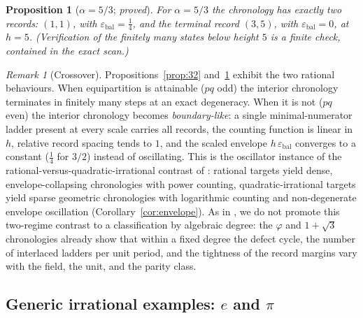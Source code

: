 \documentclass[11pt]{article}
\newtheorem{proposition}[theorem]{Proposition}
\theoremstyle{definition}
\theoremstyle{remark}
\newtheorem{remark}[theorem]{Remark}
\newcommand{\eb}{\varepsilon_{\mathrm{bal}}}
\begin{document}
\begin{proposition}[$\alpha=5/3$; \emph{proved}]\label{prop:53}
For $\alpha=5/3$ the chronology has exactly two records: $(1,1)$, with $\eb=\tfrac14$, and the terminal record $(3,5)$, with $\eb=0$, at $h=5$. (Verification of the finitely many states below height $5$ is a finite check, contained in the exact scan.)
\end{proposition}

\begin{remark}[Crossover]\label{rem:crossover}
Propositions~\ref{prop:32} and~\ref{prop:53} exhibit the two rational behaviours. When equipartition is attainable ($pq$ odd) the interior chronology terminates in finitely many steps at an exact degeneracy. When it is not ($pq$ even) the interior chronology becomes \emph{boundary-like}: a single minimal-numerator ladder present at every scale carries all records, the counting function is linear in $h$, relative record spacing tends to $1$, and the scaled envelope $h\,\eb$ converges to a constant ($\tfrac14$ for $3/2$) instead of oscillating. This is the oscillator instance of the rational-versus-quadratic-irrational contrast of \cite{quartercircle}: rational targets yield dense, envelope-collapsing chronologies with power counting, quadratic-irrational targets yield sparse geometric chronologies with logarithmic counting and non-degenerate envelope oscillation (Corollary~\ref{cor:envelope}). As in \cite[\S7]{quartercircle}, we do not promote this two-regime contrast to a classification by algebraic degree: the $\varphi$ and $1+\sqrt3$ chronologies already show that within a fixed degree the defect cycle, the number of interlaced ladders per unit period, and the tightness of the record margins vary with the field, the unit, and the parity class.
\end{remark}

\subsection{Generic irrational examples: $e$ and $\pi$}\label{sec:generic}
\end{document}
